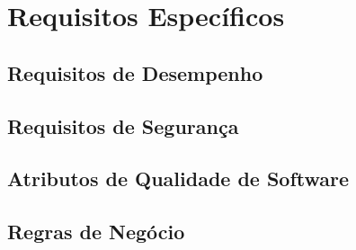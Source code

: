 
\chapter{Requisitos Específicos}

\section{Requisitos de Desempenho}

\section{Requisitos de Segurança}

\section{Atributos de Qualidade de Software}

\section{Regras de Negócio}